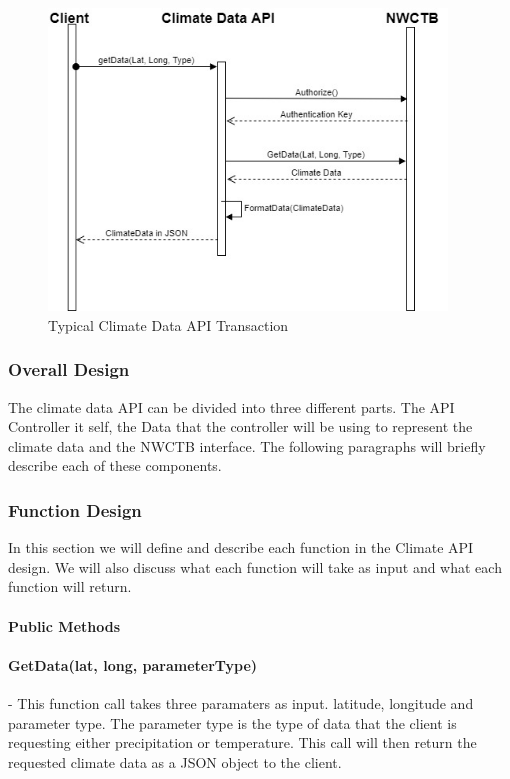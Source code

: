 \documentclass[onecolumn, draftclsnofoot,10pt, compsoc]{article}
\begin{document}
		\begin{figure}[htb]
			\begin{center}
				\includegraphics[width=300pt]{UMLDiagrams/ClimateDataAPITransaction.jpg}
			\end{center}
			\caption{Typical Climate Data API Transaction}
			\label{fig:CDAPITrans}
		\end{figure}



			\subsubsection{Overall Design}
				The climate data API can be divided into three different parts. The API Controller it self, the Data that the controller will be using to represent the climate data and the NWCTB interface. The following paragraphs will briefly describe each of these components.
			\subsubsection{Function Design}
			In this section we will define and describe each function in the Climate API design. We will also discuss what each function will take as input and what each function will return.
					\paragraph{\textbf{Public Methods}}
					
					
					\paragraph{GetData(lat, long, parameterType)} - This function call takes three paramaters as input. latitude, longitude and parameter type. The parameter type is the type of data that the client is requesting either precipitation or temperature. This call will then return the requested climate data as a JSON object to the client.\\
\end{document}
